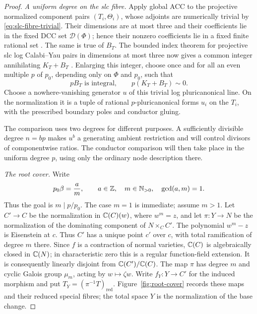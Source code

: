 \begin{proof}
\smallskip
\noindent\emph{A uniform degree on the slc fibre.}
Apply global ACC to the projective normalized component pairs
$(T_i,\Theta_i)$, whose adjoints are numerically trivial by
\eqref{eq:slc-fibre-trivial}.  Their dimensions are at most three and
their coefficients lie in the fixed DCC set
$\mathcal D(\Phi)$; hence their nonzero coefficients lie in a fixed
finite rational set \cite[Theorem~1.5]{HMX2014}.  The same is true of
$B_T$.  The bounded index theorem for projective slc log Calabi--Yau
pairs in dimensions at most three now gives a common integer
annihilating $K_T+B_T$ \cite[Corollary~1.6, arXiv version~1]{JiangLiu2021}.
Enlarging this integer, choose once and for all an even multiple $p$ of
$p_0$, depending only on $\Phi$ and $p_0$, such that
\begin{equation}
 \label{eq:slc-uniform-index}
 pB_T\text{ is integral},\qquad p(K_T+B_T)\sim0.
\end{equation}
Choose a nowhere-vanishing generator $u$ of this trivial log
pluricanonical line.  On the normalization it is a tuple of rational
$p$-pluricanonical forms $u_i$ on the $T_i$, with the prescribed boundary
poles and conductor gluing.

The comparison uses two degrees for different purposes.  A sufficiently
divisible degree $n=bp$ makes $u^b$ a generating ambient restriction
and will control divisors of componentwise ratios.  The conductor
comparison will then take place in the uniform degree $p$, using only
the ordinary node description there.

\smallskip
\noindent\emph{The root cover.}
Write
\begin{equation}
 \label{eq:slc-denominator}
 p_0\beta=\frac{a}{m},\qquad
 a\in\mathbb Z,\quad m\in\mathbb N_{>0},\quad\gcd(a,m)=1.
\end{equation}
Thus the goal is $m\mid p/p_0$. The case $m=1$ is immediate; assume $m>1$.  Let $C'\to C$ be the normalization in
$\mathbb C(C)(w)$, where $w^m=z$, and let $\pi\colon Y\to N$ be the
normalization of the dominating component of $N\times_C C'$.  The
polynomial $w^m-z$ is Eisenstein at $c$.  Thus $C'$ has a unique point
$c'$ over $c$, with total ramification of degree $m$ there.  Since $f$
is a contraction of normal varieties, $\mathbb C(C)$ is algebraically closed
in $\mathbb C(N)$; in characteristic zero this is a regular function-field
extension.  It is consequently linearly disjoint from
$\mathbb C(C')/\mathbb C(C)$.  The map $\pi$ has degree $m$ and cyclic Galois group
$\mu_m$, acting by $w\mapsto\zeta w$.
Write $f_Y:Y\to C'$ for the induced morphism and put
$T_Y=(\pi^{-1}T)_{\mathrm{red}}$. Figure~\ref{fig:root-cover}
records these maps and their reduced special fibres; the total space
$Y$ is the normalization of the base change.


\end{proof}
